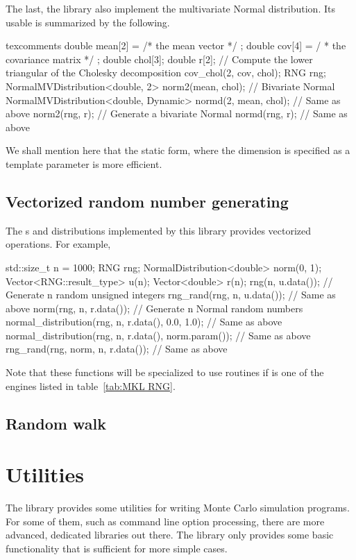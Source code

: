\documentclass[11pt,bib,mint,hyper,altcolor]{marticle}
\begin{document}
The last, the library also implement the multivariate Normal distribution. Its
usable is summarized by the following.
\begin{cppcode*}{texcomments}
  double mean[2] = { /* the mean vector */ };
  double cov[4] = { / * the covariance matrix */ };
  double chol[3];
  double r[2];
  // Compute the lower triangular of the Cholesky decomposition
  cov_chol(2, cov, chol);
  RNG rng;
  NormalMVDistribution<double, 2> norm2(mean, chol); // Bivariate Normal
  NormalMVDistribution<double, Dynamic> normd(2, mean, chol); // Same as above
  norm2(rng, r); // Generate a bivariate Normal
  normd(rng, r); // Same as above
\end{cppcode*}
We shall mention here that the static form, where the dimension is specified as
a template parameter is more efficient.

\subsection{Vectorized random number generating}
\label{sub:Vectorized random number generating}

The \rng{}s and distributions implemented by this library provides vectorized
operations. For example,
\begin{cppcode}
  std::size_t n = 1000;
  RNG rng;
  NormalDistribution<double> norm(0, 1);
  Vector<RNG::result_type> u(n);
  Vector<double> r(n);
  rng(n, u.data());           // Generate n random unsigned integers
  rng_rand(rng, n, u.data()); // Same as above
  norm(rng, n, r.data());     // Generate n Normal random numbers
  normal_distribution(rng, n, r.data(), 0.0, 1.0);     // Same as above
  normal_distribution(rng, n, r.data(), norm.param()); // Same as above
  rng_rand(rng, norm, n, r.data());                    // Same as above
\end{cppcode}
Note that these functions will be specialized to use \mkl routines if
 is one of the engines listed in table~\ref{tab:MKL RNG}.

\subsection{Random walk}
\label{sub:Random walk}

\section{Utilities}
\label{sec:Utilities}

The library provides some utilities for writing Monte Carlo simulation
programs. For some of them, such as command line option processing, there are
more advanced, dedicated libraries out there. The library only provides some
basic functionality that is sufficient for more simple cases.
\end{document}
